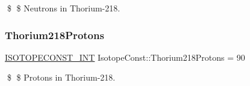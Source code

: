 \$ \$ Neutrons in Thorium-\/218. \mbox{\label{group___isotope_const-_thorium-_th218_ga10d450494f0e4346b8464b5f9ae7c73a}} 
\subsubsection{\texorpdfstring{Thorium218\+Protons}{Thorium218Protons}}
{\footnotesize\ttfamily \mbox{\hyperlink{group___isotope_const-_macros_ga5f18360b3e99483a35c32d789e62621c}{I\+S\+O\+T\+O\+P\+E\+C\+O\+N\+S\+T\+\_\+\+I\+NT}} Isotope\+Const\+::\+Thorium218\+Protons = 90}

\$ \$ Protons in Thorium-\/218. 